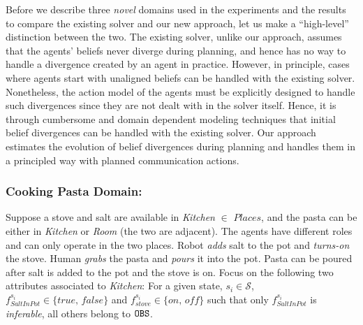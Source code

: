 \documentclass[letterpaper]{article} %
\begin{document}
Before we describe three {\em novel} domains used in the experiments and the results to compare the existing solver and our new approach, let us make a ``high-level'' distinction between the two. 
The existing solver, unlike our approach, assumes that the agents' beliefs never diverge during planning, and hence has no way to handle a divergence created by an agent in practice. However, in principle, cases where agents start with unaligned beliefs can be handled with the existing solver. Nonetheless, the action model of the agents must be explicitly designed to handle such divergences since they are not dealt with in the solver itself. Hence, it is through cumbersome and domain dependent modeling techniques that initial belief divergences can be handled with the existing solver.
Our approach estimates the evolution of belief divergences during planning and handles them in a principled way with planned communication actions.

\subsubsection{Cooking Pasta Domain:}
Suppose a stove and salt are available in \textit{Kitchen} $\in$ $\textit{Places}$, and the pasta can be either in \textit{Kitchen} or \textit{Room} (the two are adjacent). The agents have different roles and can only operate in the two places. Robot \textit{adds} salt to the pot and \textit{turns-on} the stove. Human \textit{grabs} the pasta and \textit{pours} it into the pot. 
Pasta can be poured after salt is added to the pot and the stove is {\sc on}.
Focus on the following two attributes associated to \textit{Kitchen}: For a given state, $s_i \in \mathcal{S}$, $f_{\textit{SaltInPot}}^{s_i} \in \{\textit{true, false}\}$ and $f_{\textit{stove}}^{s_i} \in \{\textit{on, off}\}$ such that only $f_{\textit{SaltInPot}}^{s_i}$ is \textit{inferable}, all others belong to $\texttt{OBS}$.
\end{document}
